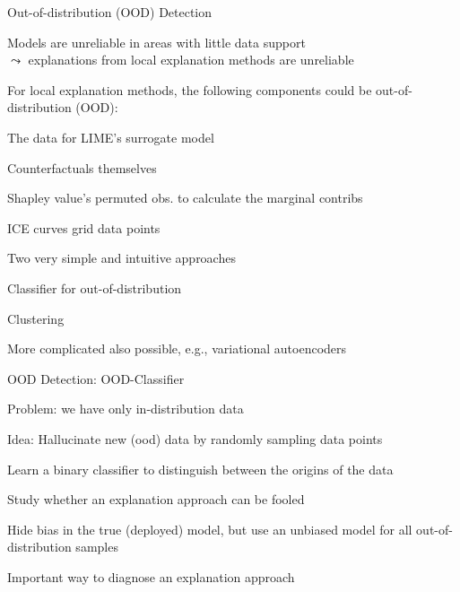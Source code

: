 \documentclass[10pt,compress,t,notes=noshow, xcolor=table]{beamer}
\begin{document}
\begin{framei}[align=top]{Out-of-distribution (OOD) Detection}
\item Models are unreliable in areas with little data support\\
$\leadsto$ explanations from local explanation methods are unreliable
\pause
\item For local explanation methods, the following components could be out-of-distribution (OOD):
\begin{itemizeS}
\item The data for LIME's surrogate model
\item Counterfactuals themselves
\item Shapley value's permuted obs. to calculate the marginal contribs
\item ICE curves grid data points
\end{itemizeS}
\pause
\item Two very simple and intuitive approaches
\begin{itemizeS}
\item Classifier for out-of-distribution
\item Clustering
\end{itemizeS}
\item More complicated also possible, e.g., variational autoencoders 
\end{framei}


\begin{framei}[align=top]{OOD Detection: OOD-Classifier}
\item Problem: we have only in-distribution data
\item Idea: Hallucinate new (ood) data by randomly sampling data points
\item[$\leadsto$] Learn a binary classifier to distinguish between the origins of the data\\
\spacer[0.25]
\pause
\item Study whether an explanation approach can be fooled 
\begin{itemizeS}
\item Hide bias in the true (deployed) model, but use an unbiased model for all out-of-distribution samples
\end{itemizeS}
\item[$\leadsto$] Important way to diagnose an explanation approach
\end{framei}
\end{document}
